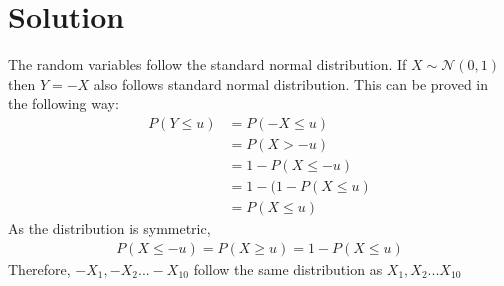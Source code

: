 \documentclass[journal,12pt,twocolumn]{IEEEtran}
\begin{document}
\section*{Solution}
The random variables follow the standard normal distribution. If $X \sim \mathcal{N}(0,1)$ then $Y =-X$ also follows standard normal distribution. This can be proved in the following way:
\begin{align}
    P(Y \leq u) &= P(-X \leq u) \\
    &= P(X > -u) \\
    &= 1 - P(X \leq -u) \\
    &= 1 - (1 - P(X \leq u) \\
    &= P(X \leq u) 
\end{align}
As the distribution is symmetric, \begin{align}
 P(X\leq -u)=P(X\geq u)= 1-P(X\leq u)   
\end{align} 
Therefore, $-X_1,-X_2 ... -X_{10}$ follow the same distribution as $X_1,X_2...X_{10}$
\end{document}
